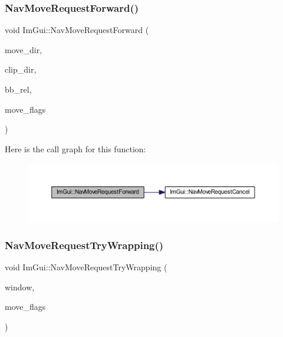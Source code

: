 \subsubsection{\texorpdfstring{Nav\+Move\+Request\+Forward()}{NavMoveRequestForward()}}
{\footnotesize\ttfamily void Im\+Gui\+::\+Nav\+Move\+Request\+Forward (\begin{DoxyParamCaption}\item[{\mbox{\hyperlink{imgui_8h_a874086389bc27cc9647118d22a806403}{Im\+Gui\+Dir}}}]{move\+\_\+dir,  }\item[{\mbox{\hyperlink{imgui_8h_a874086389bc27cc9647118d22a806403}{Im\+Gui\+Dir}}}]{clip\+\_\+dir,  }\item[{const \mbox{\hyperlink{struct_im_rect}{Im\+Rect}} \&}]{bb\+\_\+rel,  }\item[{\mbox{\hyperlink{imgui__internal_8h_aff7a453b89555bb074f2fe46a159ac25}{Im\+Gui\+Nav\+Move\+Flags}}}]{move\+\_\+flags }\end{DoxyParamCaption})}

Here is the call graph for this function\+:
\nopagebreak
\begin{figure}[H]
\begin{center}
\leavevmode
\includegraphics[width=350pt]{namespace_im_gui_a8a96ace94b2000ada6f21d7459d51920_cgraph}
\end{center}
\end{figure}
\mbox{\label{namespace_im_gui_a95a9a1a5411cccb918fc29a0b0d3f953}} 
\subsubsection{\texorpdfstring{Nav\+Move\+Request\+Try\+Wrapping()}{NavMoveRequestTryWrapping()}}
{\footnotesize\ttfamily void Im\+Gui\+::\+Nav\+Move\+Request\+Try\+Wrapping (\begin{DoxyParamCaption}\item[{\mbox{\hyperlink{struct_im_gui_window}{Im\+Gui\+Window}} $\ast$}]{window,  }\item[{\mbox{\hyperlink{imgui__internal_8h_aff7a453b89555bb074f2fe46a159ac25}{Im\+Gui\+Nav\+Move\+Flags}}}]{move\+\_\+flags }\end{DoxyParamCaption})}

